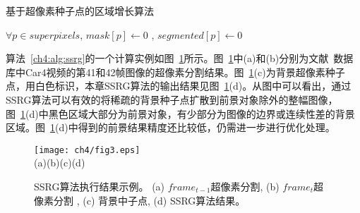 \renewcommand{\algorithmcfname}{算法}
\begin{algorithm}
\caption{基于超像素种子点的区域增长算法}
\label{ch4:alg:ssrg}
\LinesNumbered
{}
 $\forall p \in superpixels$, $mask[p] \leftarrow 0$ , $segmented[p] \leftarrow 0$ \;

\end{algorithm}

算法~\ref{ch4:alg:ssrg}的一个计算实例如图~\ref{ch4:fig:3}所示。图~\ref{ch4:fig:3}中(a)和(b)分别为文献~数据库中Car4视频的第41和42帧图像的超像素分割结果。图~\ref{ch4:fig:3}(c)为背景超像素种子点，用白色标识，本章SSRG算法的输出结果见图~\ref{ch4:fig:3}(d)。从图中可以看出，通过SSRG算法可以有效的将稀疏的背景种子点扩散到前景对象除外的整幅图像，图~\ref{ch4:fig:3}(d)中黑色区域大部分为前景对象，有少部分为图像的边界或连续性差的背景区域。图~\ref{ch4:fig:3}(d)中得到的前景结果精度还比较低，仍需进一步进行优化处理。
\begin{figure}[!htbp]
\begin{center}
\texttt{[image: ch4/fig3.eps]}\\
  (a)\quad\quad\quad\quad\quad\quad\quad\quad(b)\quad\quad\quad\quad\quad\quad\quad\quad(c)\quad\quad\quad\quad\quad\quad\quad\quad(d)
\end{center}

\caption{SSRG算法执行结果示例。 (a) $frame_{t-1}$超像素分割, (b) $frame_{t}$超像素分割 , (c) 背景中子点, (d) SSRG算法结果。}
\label{ch4:fig:3}       %
\end{figure}

